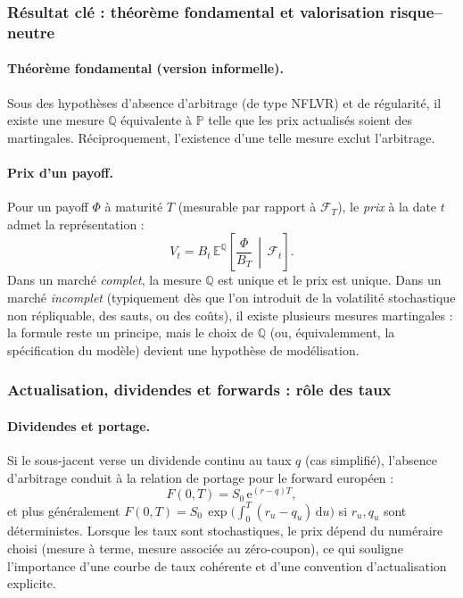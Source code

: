 \documentclass[11pt,a4paper]{article}
\newcommand{\dd}{\mathrm{d}}
\newcommand{\ee}{\mathrm{e}}
\newcommand{\E}{\mathbb{E}}
\newcommand{\PP}{\mathbb{P}}
\newcommand{\QQ}{\mathbb{Q}}
\newcommand{\1}{\mathbf{1}}
\begin{document}
\subsubsection{R\'esultat cl\'e : th\'eor\`eme fondamental et valorisation risque--neutre}

\paragraph{Th\'eor\`eme fondamental (version informelle).}
Sous des hypoth\`eses d'absence d'arbitrage (de type NFLVR) et de r\'egularit\'e, il existe une mesure $\QQ$
\'equivalente \`a $\PP$ telle que les prix actualis\'es soient des martingales. R\'eciproquement, l'existence d'une
telle mesure exclut l'arbitrage.

\paragraph{Prix d'un payoff.}
Pour un payoff $\Phi$ \`a maturit\'e $T$ (mesurable par rapport \`a $\mathcal{F}_T$), le \emph{prix} \`a la date $t$
admet la repr\'esentation :
\[
V_t = B_t\, \E^{\QQ}\!\left[\frac{\Phi}{B_T}\,\middle|\,\mathcal{F}_t\right].
\]
Dans un march\'e \emph{complet}, la mesure $\QQ$ est unique et le prix est unique. Dans un march\'e \emph{incomplet}
(typiquement d\`es que l'on introduit de la volatilité stochastique non r\'epliquable, des sauts, ou des co\^uts),
il existe plusieurs mesures martingales : la formule reste un principe, mais le choix de $\QQ$ (ou, \'equivalemment,
la sp\'ecification du mod\`ele) devient une hypoth\`ese de mod\'elisation.

\subsubsection{Actualisation, dividendes et forwards : r\^ole des taux}

\paragraph{Dividendes et portage.}
Si le sous-jacent verse un dividende continu au taux $q$ (cas simplifi\'e), l'absence d'arbitrage conduit \`a la relation
de portage pour le forward europ\'een :
\[
F(0,T)=S_0\,\ee^{(r-q)T},
\]
et plus g\'en\'eralement $F(0,T)=S_0\,\exp\!\bigl(\int_0^T (r_u-q_u)\,\dd u\bigr)$ si $r_u,q_u$ sont d\'eterministes.
Lorsque les taux sont stochastiques, le prix d\'epend du num\'eraire choisi (mesure \`a terme, mesure associ\'ee au z\'ero-coupon),
ce qui souligne l'importance d'une courbe de taux coh\'erente et d'une convention d'actualisation explicite.
\end{document}
